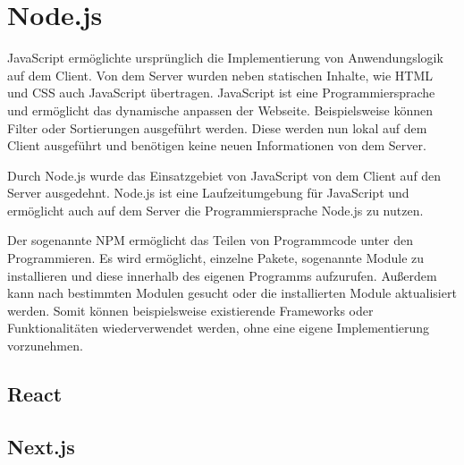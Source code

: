 \section{Node.js}
    JavaScript ermöglichte ursprünglich die Implementierung von Anwendungslogik auf dem Client. Von dem Server wurden neben statischen Inhalte, wie HTML und CSS auch JavaScript übertragen. JavaScript ist eine Programmiersprache und ermöglicht das dynamische anpassen der Webseite. Beispielsweise können Filter oder Sortierungen ausgeführt werden. Diese werden nun lokal auf dem Client ausgeführt und benötigen keine neuen Informationen von dem Server. 

    Durch Node.js wurde das Einsatzgebiet von JavaScript von dem Client auf den Server ausgedehnt. Node.js ist eine Laufzeitumgebung für JavaScript und ermöglicht auch auf dem Server die Programmiersprache Node.js zu nutzen. 
    
    Der sogenannte \gls{NPM} ermöglicht das Teilen von Programmcode unter den Programmieren. Es wird ermöglicht, einzelne Pakete, sogenannte Module zu installieren und diese innerhalb des eigenen Programms aufzurufen. Außerdem kann nach bestimmten Modulen gesucht oder die installierten Module aktualisiert werden. Somit können beispielsweise existierende Frameworks oder Funktionalitäten wiederverwendet werden, ohne eine eigene Implementierung vorzunehmen.  
    
    

    \subsection{React}
    
    \subsection{Next.js}

    
\begin{comment}
    - JavaScript und TypeScript mit beleuchten
\end{comment}